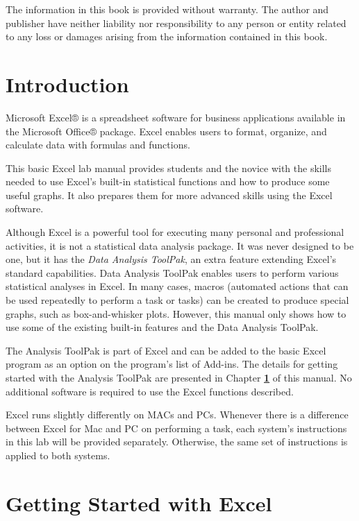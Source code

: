 \documentclass[
]{book}
\begin{document}
The information in this book is provided without warranty. The author and publisher have neither liability nor responsibility to any person or entity related to any loss or damages arising from the information contained in this book.

\hypertarget{introduction}{%
\chapter*{Introduction}\label{introduction}}

Microsoft Excel® is a spreadsheet software for business applications available in the Microsoft Office® package. Excel enables users to format, organize, and calculate data with formulas and functions.

This basic Excel lab manual provides students and the novice with the skills needed to use Excel's built-in statistical functions and how to produce some useful graphs. It also prepares them for more advanced skills using the Excel software.

Although Excel is a powerful tool for executing many personal and professional activities, it is not a statistical data analysis package. It was never designed to be one, but it has the \emph{Data Analysis ToolPak}, an extra feature extending Excel's standard capabilities. Data Analysis ToolPak enables users to perform various statistical analyses in Excel. In many cases, macros (automated actions that can be used repeatedly to perform a task or tasks) can be created to produce special graphs, such as box-and-whisker plots.
However, this manual only shows how to use some of the existing built-in features and the Data Analysis ToolPak.

The Analysis ToolPak is part of Excel and can be added to the basic Excel program as an option on the program's list of Add-ins. The details for getting started with the Analysis ToolPak are presented in Chapter \textbf{\ref{start}} of this manual. No additional software is required to use the Excel functions described.

Excel runs slightly differently on MACs and PCs. Whenever there is a difference between Excel for Mac and PC on performing a task, each system's instructions in this lab will be provided separately. Otherwise, the same set of instructions is applied to both systems.

\hypertarget{start}{%
\chapter{Getting Started with Excel}\label{start}}
\end{document}
